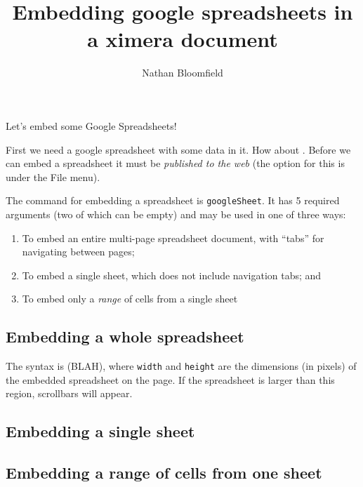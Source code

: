 \documentclass{ximera}
\title{Embedding google spreadsheets in a ximera document}
\author{Nathan Bloomfield}
\begin{document}
\maketitle

Let's embed some Google Spreadsheets!

First we need a google spreadsheet with some data in it. How about . Before we can embed a spreadsheet it must be \emph{published to the web} (the option for this is under the File menu).

The command for embedding a spreadsheet is \texttt{googleSheet}. It has 5 required arguments (two of which can be empty) and may be used in one of three ways:
\begin{enumerate}
\item To embed an entire multi-page spreadsheet document, with ``tabs'' for navigating between pages;
\item To embed a single sheet, which does not include navigation tabs; and
\item To embed only a \emph{range} of cells from a single sheet
\end{enumerate}

\subsection{Embedding a whole spreadsheet}

The syntax is (BLAH), where \texttt{width} and \texttt{height} are the dimensions (in pixels) of the embedded spreadsheet on the page. If the spreadsheet is larger than this region, scrollbars will appear.



\subsection{Embedding a single sheet}



\subsection{Embedding a range of cells from one sheet}

\end{document}

